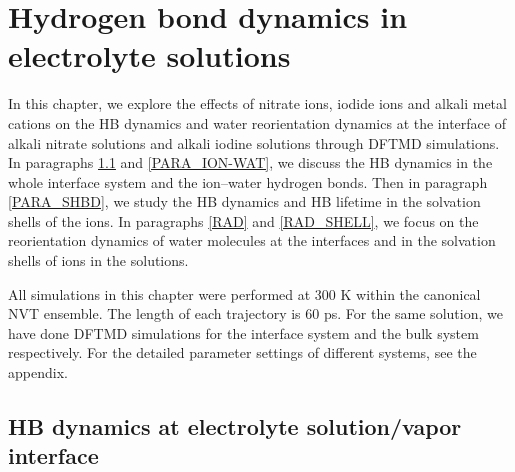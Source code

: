 \chapter{Hydrogen bond dynamics in electrolyte solutions}\label{CHAPTER_HB_SOLUTIONS}
In this chapter, we explore the effects of nitrate ions, iodide ions and alkali metal cations 
on the HB dynamics and water reorientation dynamics at the interface of alkali nitrate solutions and alkali
iodine solutions through DFTMD simulations. %
In paragraphs \ref{HBD_ITP} and \ref{PARA_ION-WAT}, we discuss the HB dynamics in the whole interface system and the ion--water hydrogen bonds. 
Then in paragraph \ref{PARA_SHBD}, we study the HB dynamics and HB lifetime in the solvation shells of the ions.
In paragraphs \ref{RAD} and \ref{RAD_SHELL}, we focus on the reorientation dynamics of water molecules at the interfaces
and in the solvation shells of ions in the solutions.

All simulations in this chapter were performed at 300 K within the canonical NVT ensemble.
The length of each trajectory is 60 ps.
For the same solution, we have done DFTMD simulations for the interface system and the bulk system respectively. 
For the detailed parameter settings of different systems, see the appendix.


\section{HB dynamics at electrolyte solution/vapor interface}\label{HBD_ITP}
